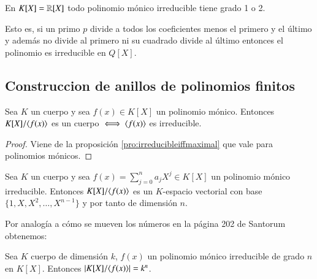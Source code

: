 \begin{obs}
	En $K[X] = \mathbb{R}[X]$ todo polinomio mónico irreducible tiene grado 1 o 2.
\end{obs}

Esto es, si un primo $p$ divide a todos los coeficientes menos el primero y el último y además no divide al primero ni su cuadrado divide al último entonces el polinomio es irreducible en $Q[X]$.


\subsection{Construccion de anillos de polinomios finitos}

\begin{pro}
	Sea $K$ un cuerpo y sea $f(x) \in K[X]$ un polinomio mónico. Entonces $K[X]/\langle f(x)\rangle$ es un cuerpo $\iff \langle f(x)\rangle$ es irreducible.
\end{pro}

\begin{proof}
	Viene de la proposición \autoref{pro:irreducibleiffmaximal} que vale para polinomios mónicos.
\end{proof}

\begin{thm}
	Sea $K$ un cuerpo y sea $f(x) = \sum_{j=0}^n a_j X^j \in K[X]$ un polinomio mónico irreducible. Entonces $K[X] / \langle f(x)\rangle$ es un $K$-espacio vectorial con base $\{1, X, X^2, \dots, X^{n-1}\}$ y por tanto de dimensión $n$.
\end{thm}

Por analogía a cómo se mueven los números en la página 202 de Santorum obtenemos:

\begin{pro}
	Sea $K$ cuerpo de dimensión $k$, $f(x)$ un polinomio mónico irreducible de grado $n$ en $K[X]$. Entonces $|K[X]/\langle f(x)\rangle| = k^n$.
\end{pro}

